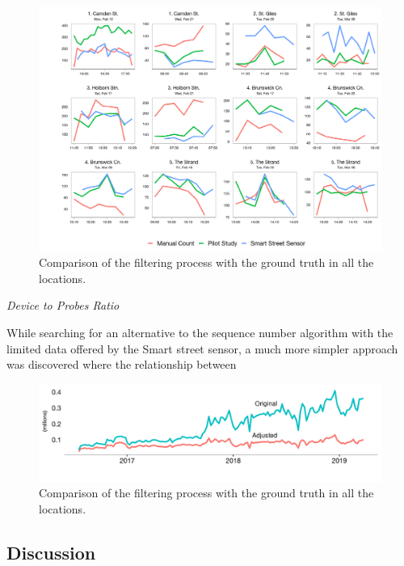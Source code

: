 \begin{figure}
  \includegraphics[trim={15 5 5 5}, clip]{images/processing-sss-compare.png}
  \caption{Comparison of the filtering process with the ground truth in all the locations.}
  \label{figure:processing:sss:comparison}
\end{figure}

\vspace{1.5em}\noindent\textit{Device to Probes Ratio}\vspace{0.5em}

While searching for an alternative to the sequence number algorithm with the limited data offered by the Smart street sensor, a much more simpler approach was discovered where the relationship between

\begin{figure}
  \includegraphics{images/processing-sss-final.png}
  \caption{Comparison of the filtering process with the ground truth in all the locations.}
  \label{figure:processing:sss:final}
\end{figure}

\subsection{Discussion}

